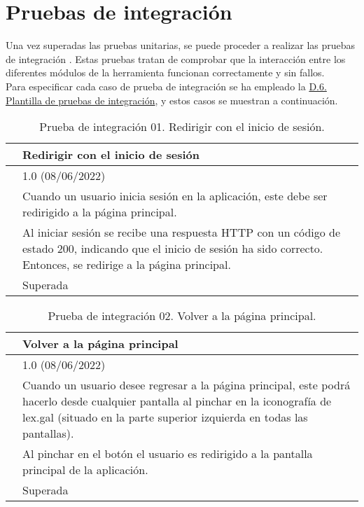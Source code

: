 \section{Pruebas de integración}

Una vez superadas las pruebas unitarias, se puede proceder a realizar las pruebas de integración \cite{pruebaintegracion}. Estas pruebas tratan de comprobar que la interacción entre los diferentes módulos de la herramienta funcionan correctamente y sin fallos. 
\\

Para especificar cada caso de prueba de integración se ha empleado la \hyperref[enlacePIX]{D.6. Plantilla de pruebas de integración}, y estos casos se muestran a continuación.

\begin{table}[H]
\begin{center}
\begin{tabular}{|p{3cm}|p{10cm}|} \hline
\centering {\bf PI-01} & Redirigir con el inicio de sesión  \\ \hline\hline
\centering {\bf Versión} & 1.0 (08/06/2022) \\ \hline
\centering {\bf Descripción} & Cuando un usuario inicia sesión en la aplicación, este debe ser redirigido a la página principal. \\ \hline
\centering {\bf Criterio de aceptación} & Al iniciar sesión se recibe una respuesta HTTP con un código de estado 200, indicando que el inicio de sesión ha sido correcto. Entonces, se redirige a la página principal. \\ \hline
\centering {\bf Estado} & Superada \\ \hline
\end{tabular}
\caption{Prueba de integración 01. Redirigir con el inicio de sesión.}
\label{enlacePI1}
\end{center}
\end{table}

\begin{table}[H]
\begin{center}
\begin{tabular}{|p{3cm}|p{10cm}|} \hline
\centering {\bf PI-02} & Volver a la página principal  \\ \hline\hline
\centering {\bf Versión} & 1.0 (08/06/2022) \\ \hline
\centering {\bf Descripción} & Cuando un usuario desee regresar a la página principal, este podrá hacerlo desde cualquier pantalla al pinchar en la iconografía de lex.gal (situado en la parte superior izquierda en todas las pantallas). \\ \hline
\centering {\bf Criterio de aceptación} & Al pinchar en el botón el usuario es redirigido a la pantalla principal de la aplicación. \\ \hline
\centering {\bf Estado} & Superada \\ \hline
\end{tabular}
\caption{Prueba de integración 02. Volver a la página principal.}
\label{enlacePI2}
\end{center}
\end{table}

